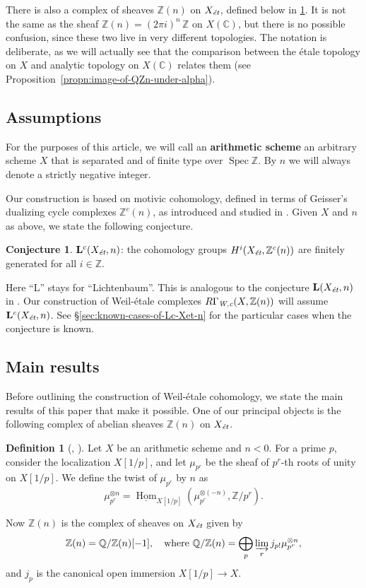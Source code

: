 \documentclass{article}
\DeclareMathOperator{\Hom}{Hom}
\DeclareMathOperator{\Spec}{Spec}
\newcommand{\CC}{\mathbb{C}}
\newcommand{\QQ}{\mathbb{Q}}
\newcommand{\ZZ}{\mathbb{Z}}
\newcommand{\et}{\text{\it ét}}
\newcommand{\Wc}{\text{\it W,c}}
\newcommand{\iHom}{\underline{\Hom}}
\theoremstyle{definition}
\newtheorem{definition}[theorem]{Definition}
\newtheorem*{conjecture*}{Conjecture}
\numberwithin{equation}{section}
\begin{document}
There is also a complex of sheaves $\ZZ (n)$ on $X_\et$, defined below in
\ref{dfn:sheaf-Z(n)}. It is not the same as the sheaf
$\ZZ (n) = (2\pi i)^n\,\ZZ$ on $X (\CC)$, but there is no possible confusion,
since these two live in very different topologies. The notation is deliberate,
as we will actually see that the comparison between the étale topology on $X$
and analytic topology on $X (\CC)$ relates them
(see Proposition~\ref{propn:image-of-QZn-under-alpha}).

\subsection*{Assumptions}

For the purposes of this article, we will call an \textbf{arithmetic scheme} an
arbitrary scheme $X$ that is separated and of finite type over $\Spec \ZZ$.
By $n$ we will always denote a strictly negative integer.

Our construction is based on motivic cohomology, defined in terms of Geisser's
dualizing cycle complexes $\ZZ^c (n)$, as introduced and studied in
\cite{Geisser-2010}. Given $X$ and $n$ as above, we state the following
conjecture.

\begin{conjecture*}
  $\mathbf{L}^c (X_\et,n)$: the cohomology groups $H^i (X_\et, \ZZ^c (n))$ are
  finitely generated for all $i \in \ZZ$.
\end{conjecture*}

Here ``L'' stays for ``Lichtenbaum''. This is analogous to the conjecture
$\mathbf{L} (X_\et,n)$ in \cite[\S 3.2]{Flach-Morin-2018}. Our construction of
Weil-étale complexes $R\Gamma_\Wc (X,\ZZ(n))$ will assume
$\mathbf{L}^c (X_\et,n)$. See \S\ref{sec:known-cases-of-Lc-Xet-n} for the
particular cases when the conjecture is known.

\subsection*{Main results}

Before outlining the construction of Weil-étale cohomology, we state the main
results of this paper that make it possible. One of our principal objects is the
following complex of abelian sheaves $\ZZ (n)$ on $X_\et$.

\begin{definition}[{\cite[\S 3.1]{Flach-Morin-2018}}, {\cite[\S 7]{Geisser-2004}}]
  \label{dfn:sheaf-Z(n)}
  Let $X$ be an arithmetic scheme and $n < 0$. For a prime $p$, consider
  the localization $X [1/p]$, and let $\mu_{p^r}$ be the sheaf of $p^r$-th
  roots of unity on $X [1/p]$. We define the twist of $\mu_{p^r}$ by $n$
  as
  $$\mu_{p^r}^{\otimes n} = \iHom_{X[1/p]} (\mu_{p^r}^{\otimes (-n)}, \ZZ/p^r).$$

  Now $\ZZ (n)$ is the complex of sheaves on $X_\et$ given by
  \[ \ZZ (n) = \QQ/\ZZ (n) [-1],
  \quad \text{where }
  \QQ/\ZZ (n) = \bigoplus_p \varinjlim_r j_{p!} \mu_{p^r}^{\otimes n}, \]
  and $j_p$ is the canonical open immersion $X[1/p] \to X$.
\end{definition}
\end{document}
